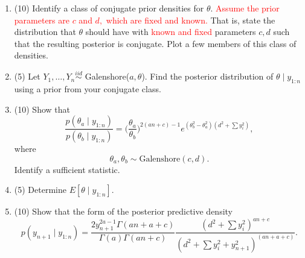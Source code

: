 \documentclass{article}
\begin{document}
\begin{enumerate}
\begin{enumerate}
\item (10) Identify a class of conjugate prior densities for $\theta$. \textcolor{red}{Assume the prior parameters are \textcolor{red}{$c$ and $d,$ which are fixed and known.}} That is, state the distribution that $\theta$ should have with \textcolor{red}{known and fixed} parameters $c,d$ such that the resulting posterior is conjugate. Plot a few members of this class of densities.
\item (5) Let $Y_1, \ldots, Y_n \stackrel{iid}{\sim}$ Galenshore($a, \theta$). Find the posterior distribution of $\theta \mid y_{1:n}$ using a prior from your conjugate class. 
\item (10) Show that $$\frac{p(\theta_a \mid y_{1:n})}{p(\theta_b \mid y_{1:n})} = \bigg( \frac{\theta_a}{\theta_b} \bigg)^{2(an + c) - 1}
e^{(\theta_b^2 - \theta_a^2)(d^2 + \sum y_i^2)},$$ where $$\theta_a, \theta_b \sim \text{Galenshore}(c,d).$$ Identify a sufficient statistic. 
\item (5) Determine $E[\theta \mid y_{1:n}]$.
\item (10) Show that the form of the posterior predictive density $$p(y_{n+1} \mid y_{1:n}) =  \frac{2 y_{n+1}^{2a - 1} \Gamma(an + a + c)}{\Gamma(a)\Gamma(an + c)}
\frac{(d^2 + \sum y_i^2)^{an + c}}{(d^2 + \sum y_i^2 + y_{n+1}^2)^{(an + a + c)}}.$$


\end{enumerate}

\end{enumerate}
\end{document}
